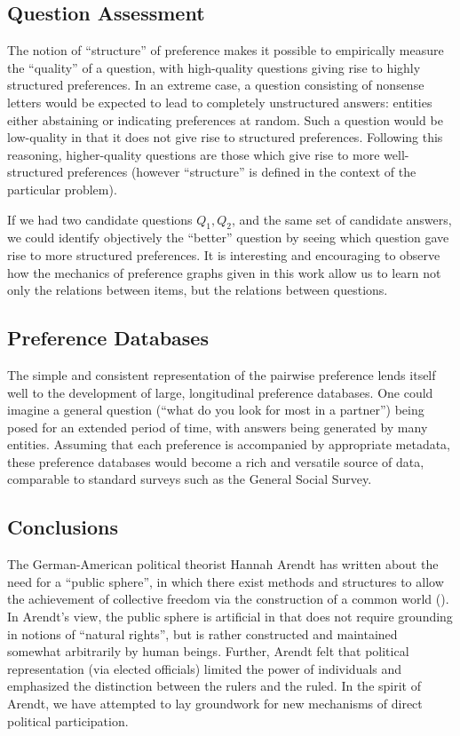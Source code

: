 \subsection{Question Assessment}

The notion of ``structure'' of preference makes it possible to empirically measure the ``quality'' of a question, with high-quality questions giving rise to highly structured preferences.
In an extreme case, a question consisting of nonsense letters would be expected to lead to completely unstructured answers: entities either abstaining or indicating preferences at random.
Such a question would be low-quality in that it does not give rise to structured preferences.
Following this reasoning, higher-quality questions are those which give rise to more well-structured preferences (however ``structure'' is defined in the context of the particular problem).

If we had two candidate questions $Q_1, Q_2$, and the same set of candidate answers, we could identify objectively the ``better'' question by seeing which question gave rise to more structured preferences.
It is interesting and encouraging to observe how the mechanics of preference graphs given in this work allow us to learn not only the relations between items, but the relations between questions.

\subsection{Preference Databases}

The simple and consistent representation of the pairwise preference lends itself well to the development of large, longitudinal preference databases.
One could imagine a general question (``what do you look for most in a partner'') being posed for an extended period of time, with answers being generated by many entities.
Assuming that each preference is accompanied by appropriate metadata, these preference databases would become a rich and versatile source of data, comparable to standard surveys such as the General Social Survey.

\subsection{Conclusions}

The German-American political theorist Hannah Arendt has written about the need for a ``public sphere'', in which there exist methods and structures to allow the achievement of collective freedom via the construction of a common world (\cite{dentreves:2016}).
In Arendt's view, the public sphere is artificial in that does not require grounding in notions of ``natural rights'', but is rather constructed and maintained somewhat arbitrarily by human beings.
Further, Arendt felt that political representation (via elected officials) limited the power of individuals and emphasized the distinction between the rulers and the ruled.
In the spirit of Arendt, we have attempted to lay groundwork for new mechanisms of direct political participation.

